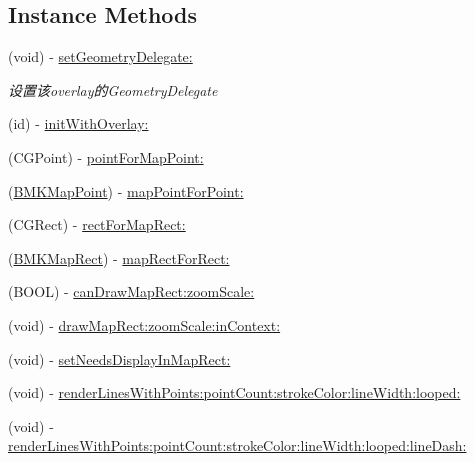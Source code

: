 \subsection*{Instance Methods}
\begin{DoxyCompactItemize}
\item 
\hypertarget{interface_b_m_k_overlay_view_a2a9f42799b36989d9f1faac29892026a}{}(void) -\/ \hyperlink{interface_b_m_k_overlay_view_a2a9f42799b36989d9f1faac29892026a}{set\+Geometry\+Delegate\+:}\label{interface_b_m_k_overlay_view_a2a9f42799b36989d9f1faac29892026a}

\begin{DoxyCompactList}\small\item\em 设置该overlay的\+Geometry\+Delegate \end{DoxyCompactList}\item 
(id) -\/ \hyperlink{interface_b_m_k_overlay_view_a93cdba852e915d6a417b95edabe4af4c}{init\+With\+Overlay\+:}
\item 
(C\+G\+Point) -\/ \hyperlink{interface_b_m_k_overlay_view_a211d0d55b1c10b0abca45e83f4fcf05c}{point\+For\+Map\+Point\+:}
\item 
(\hyperlink{struct_b_m_k_map_point}{B\+M\+K\+Map\+Point}) -\/ \hyperlink{interface_b_m_k_overlay_view_ab0270107a383cf49fd46d9b624604d53}{map\+Point\+For\+Point\+:}
\item 
(C\+G\+Rect) -\/ \hyperlink{interface_b_m_k_overlay_view_a4eb52fd9951bcfc898e9a026ee40e99e}{rect\+For\+Map\+Rect\+:}
\item 
(\hyperlink{struct_b_m_k_map_rect}{B\+M\+K\+Map\+Rect}) -\/ \hyperlink{interface_b_m_k_overlay_view_ae8c0f0415357f281451eaa602b3f388b}{map\+Rect\+For\+Rect\+:}
\item 
(B\+O\+O\+L) -\/ \hyperlink{interface_b_m_k_overlay_view_ad5c0685243ded79bc6657ebb7df08f87}{can\+Draw\+Map\+Rect\+:zoom\+Scale\+:}
\item 
(void) -\/ \hyperlink{interface_b_m_k_overlay_view_aad771b4c325461d99b142e79287188dc}{draw\+Map\+Rect\+:zoom\+Scale\+:in\+Context\+:}
\item 
(void) -\/ \hyperlink{interface_b_m_k_overlay_view_aca005b8bf49d57b404da473fd6f0d534}{set\+Needs\+Display\+In\+Map\+Rect\+:}
\item 
(void) -\/ \hyperlink{interface_b_m_k_overlay_view_a67fcc048446dfa1725aa4a86b241b282}{render\+Lines\+With\+Points\+:point\+Count\+:stroke\+Color\+:line\+Width\+:looped\+:}
\item 
(void) -\/ \hyperlink{interface_b_m_k_overlay_view_a81a56677ce4da3b33a07430793784341}{render\+Lines\+With\+Points\+:point\+Count\+:stroke\+Color\+:line\+Width\+:looped\+:line\+Dash\+:}

\end{DoxyCompactItemize}

